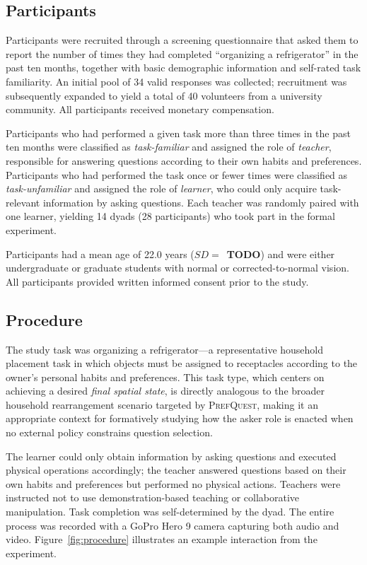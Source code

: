 \documentclass[manuscript,review,anonymous]{acmart}
\begin{document}
\subsection{Participants}

Participants were recruited through a screening questionnaire that asked them to report the number of times they had completed ``organizing a refrigerator'' in the past ten months, together with basic demographic information and self-rated task familiarity. An initial pool of 34 valid responses was collected; recruitment was subsequently expanded to yield a total of 40 volunteers from a university community. All participants received monetary compensation.

Participants who had performed a given task more than three times in the past ten months were classified as \textit{task-familiar} and assigned the role of \textit{teacher}, responsible for answering questions according to their own habits and preferences. Participants who had performed the task once or fewer times were classified as \textit{task-unfamiliar} and assigned the role of \textit{learner}, who could only acquire task-relevant information by asking questions. Each teacher was randomly paired with one learner, yielding 14 dyads (28 participants) who took part in the formal experiment.

Participants had a mean age of 22.0 years ($SD = $~\textbf{TODO}) and were either undergraduate or graduate students with normal or corrected-to-normal vision. All participants provided written informed consent prior to the study.

\subsection{Procedure}

The study task was organizing a refrigerator---a representative household placement task in which objects must be assigned to receptacles according to the owner's personal habits and preferences. This task type, which centers on achieving a desired \textit{final spatial state}, is directly analogous to the broader household rearrangement scenario targeted by \textsc{PrefQuest}, making it an appropriate context for formatively studying how the asker role is enacted when no external policy constrains question selection.

The learner could only obtain information by asking questions and executed physical operations accordingly; the teacher answered questions based on their own habits and preferences but performed no physical actions. Teachers were instructed not to use demonstration-based teaching or collaborative manipulation. Task completion was self-determined by the dyad. The entire process was recorded with a GoPro Hero 9 camera capturing both audio and video. Figure~\ref{fig:procedure} illustrates an example interaction from the experiment.
\end{document}
